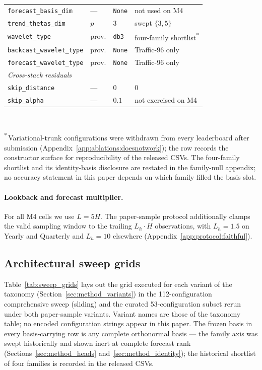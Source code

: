 \begin{table}[h]
\begin{tabular}{@{}llll@{}}
\texttt{forecast\_basis\_dim} & --- & \texttt{None} & not used on M4 \\
\texttt{trend\_thetas\_dim} & $p$ & $3$ & swept $\{3, 5\}$ \\
\texttt{wavelet\_type} & prov. & \texttt{db3} & four-family shortlist\textsuperscript{*} \\
\texttt{backcast\_wavelet\_type} & prov. & \texttt{None} & Traffic-96 only \\
\texttt{forecast\_wavelet\_type} & prov. & \texttt{None} & Traffic-96 only \\
\midrule
\multicolumn{4}{l}{\textit{Cross-stack residuals}} \\
\texttt{skip\_distance} & --- & $0$ & $0$ \\
\texttt{skip\_alpha} & --- & $0.1$ & not exercised on M4 \\
\bottomrule
\end{tabular}\\[0.3em]
\begin{minipage}{0.92\linewidth}
\footnotesize
\textsuperscript{*}\,Variational-trunk configurations were withdrawn from
every leaderboard after submission (Appendix~\ref{app:ablations:doesnotwork});
the row records the constructor surface for reproducibility of the released
CSVs. The four-family shortlist and its identity-basis disclosure are
restated in the family-null appendix; no accuracy statement in this paper
depends on which family filled the basis slot.
\end{minipage}
\end{table}

\paragraph{Lookback and forecast multiplier.} For all M4 cells we use
$L = 5H$. The paper-sample protocol additionally clamps the valid sampling
window to the trailing $L_h \cdot H$ observations, with $L_h = 1.5$ on
Yearly and Quarterly and $L_h = 10$ elsewhere
(Appendix~\ref{app:protocol:faithful}).

\subsection{Architectural sweep grids}
\label{app:hyperparams:grids}

Table~\ref{tab:sweep_grids} lays out the grid executed for each variant of
the taxonomy (Section~\ref{sec:method_variants}) in the 112-configuration
comprehensive sweep (sliding) and the curated 53-configuration subset rerun
under both paper-sample variants. Variant names are those of the taxonomy
table; no encoded configuration strings appear in this paper. The frozen
basis in every basis-carrying row is any complete orthonormal basis --- the
family axis was swept historically and shown inert at complete forecast
rank (Sections~\ref{sec:method_heads}
and~\ref{sec:method_identity}); the historical shortlist of four families is
recorded in the released CSVs.

